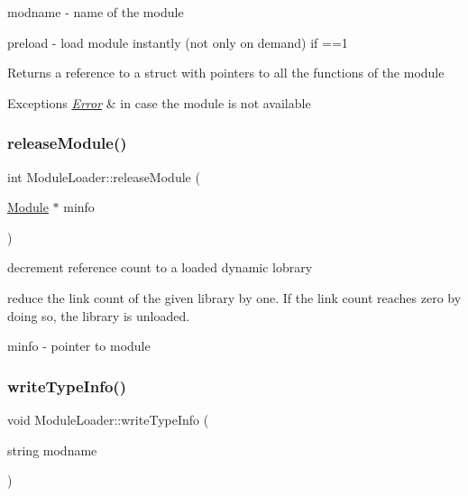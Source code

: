 \begin{DoxyItemize}
\item {\ttfamily modname} -\/ name of the module \item {\ttfamily preload} -\/ load module instantly (not only on demand) if ==1 \begin{DoxyReturn}{Returns}
a reference to a struct with pointers to all the functions of the module 
\end{DoxyReturn}

\begin{DoxyExceptions}{Exceptions}
{\em \hyperlink{classError}{Error}} & in case the module is not available \\
\hline
\end{DoxyExceptions}
\end{DoxyItemize}
\mbox{\label{classModuleLoader_aa9dd4cbeb24b4a413a270c192bce95b4}} 
\subsubsection{\texorpdfstring{release\+Module()}{releaseModule()}}
{\footnotesize\ttfamily int Module\+Loader\+::release\+Module (\begin{DoxyParamCaption}\item[{\hyperlink{classModule}{Module} $\ast$}]{minfo }\end{DoxyParamCaption})}



decrement reference count to a loaded dynamic lobrary 

reduce the link count of the given library by one. If the link count reaches zero by doing so, the library is unloaded.

\begin{DoxyItemize}
\item {\ttfamily minfo} -\/ pointer to module \end{DoxyItemize}
\mbox{\label{classModuleLoader_ac3ddb6d3909749301dea325f1e820f2d}} 
\subsubsection{\texorpdfstring{write\+Type\+Info()}{writeTypeInfo()}}
{\footnotesize\ttfamily void Module\+Loader\+::write\+Type\+Info (\begin{DoxyParamCaption}\item[{string}]{modname }\end{DoxyParamCaption})}



